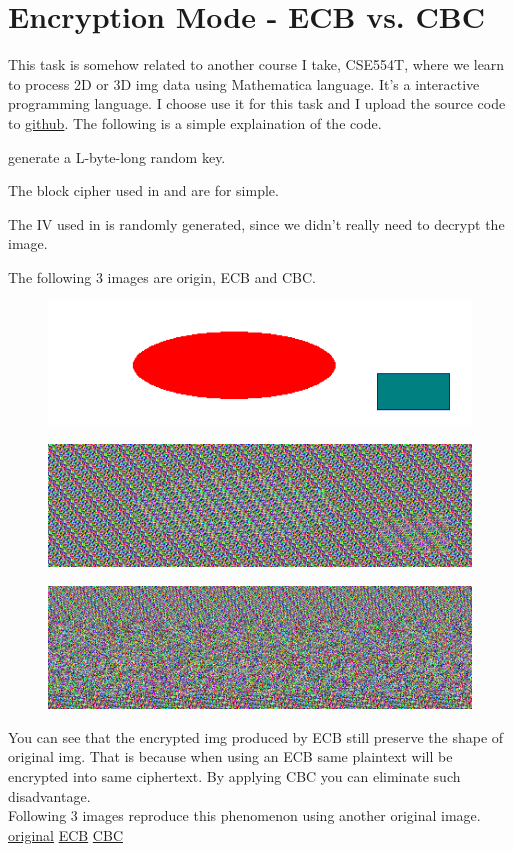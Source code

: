\documentclass{article}
\begin{document}
\section{Encryption Mode - ECB vs. CBC}
This task is somehow related to another course I take, CSE554T, where we learn to process 2D or 3D img data using Mathematica language. It's a interactive programming language. I choose use it for this task and I upload the source code to \href{https://github.com/Luna1996/WUSTL/blob/master/571/L2/task2.m}{github}. The following is a simple explaination of the code.
\begin{tlist}{3}
	\item[1.] generate a L-byte-long random key.
	\item[2.]The block cipher used in  and  are  for simple.
	\item[3.]The IV used in  is randomly generated, since we didn't really need to decrypt the image.
\end{tlist}
The following 3 images are origin, ECB and CBC.
\begin{figure}[H]\centering\includegraphics{pic_original.png}\end{figure}
\begin{figure}[H]\centering\includegraphics{pic_ecb.png}\end{figure}
\begin{figure}[H]\centering\includegraphics{pic_cbc.png}\end{figure}
You can see that the encrypted img produced by ECB still preserve the shape of original img. That is because when using an ECB same plaintext will be encrypted into same ciphertext. By applying CBC you can eliminate such disadvantage.\\
Following 3 images reproduce this phenomenon using another original image.
\href{https://i.loli.net/2018/09/24/5ba874d18c3b5.jpg}{original}
\href{https://i.loli.net/2018/09/24/5ba874d19386e.jpg}{ECB}
\href{https://i.loli.net/2018/09/24/5ba874d193869.jpg}{CBC}
\end{document}
